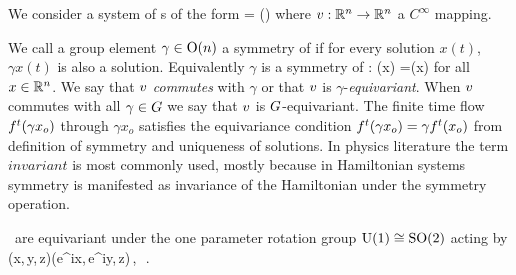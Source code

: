 
We consider a system of \ode s of the form
\beq
	\dot{\ssp} = \vf(\ssp)
	\label{eq:difeq}
\eeq
where $v: \mathbb{R}^{n} \rightarrow \mathbb{R}^{n}$ a $C^\infty$ mapping.

We call a group element $\gamma\in\mathrm{O}(n)$ a symmetry of
 if for every solution $x(t)$, $\gamma x(t)$
is also a solution. Equivalently $\gamma$ is a symmetry of :
\beq
	\vf(\gamma x) =\gamma \vf(x)
	\label{eq:equiv}
\eeq
for all $x\in\mathbb{R}^{n}$. We say that $v$ \emph{commutes} with
$\gamma$ or that $v$ is $\gamma$-\emph{equivariant}. When
$v$ commutes with all $\gamma\in G$ we say that $v$
is $G$-equivariant. The finite time flow
${f^{t}(\gamma x_o)}$ through $\gamma x_o$ satisfies the
equivariance condition ${f^{t}(\gamma x_o)}=\gamma
{f^{t}(x_o)}$ from definition of symmetry and uniqueness of
solutions. In physics literature the term $invariant$ is most
commonly used, mostly because in Hamiltonian systems symmetry
is manifested as invariance of the Hamiltonian under the
symmetry operation.

\CLe\ are equivariant under the one parameter rotation
group $\mathrm{U}(1)\cong\mathrm{SO}(2)$ acting by
\beq
	(x,\,y,\,z)\mapsto (e^{i\theta}x,\,e^{i\theta}y,\,z)\,,\ \theta\in[0,2\pi]\,.
\eeq 
{}


